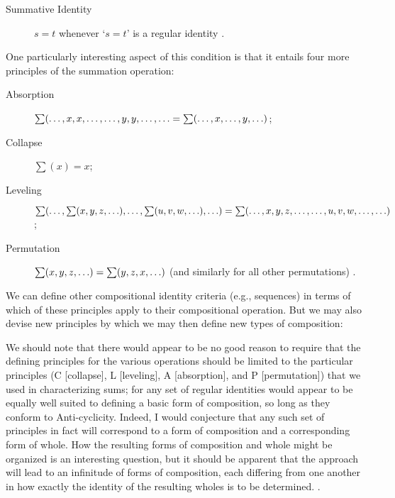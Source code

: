 \documentclass[11pt]{article}
\newenvironment{squote}{%
\begin{spacing}{1}
\begin{list}{}{%
\setlength{\labelwidth}{0pt}%
\rightmargin\leftmargin%
}
\item\relax
}{%
\end{list}%
\end{spacing}
}
\begin{document}
\begin{spacing}{1.5}
\begin{description}
  \item[Summative Identity] $s = t$ whenever `$s = t$' is a regular
    identity \citeyearpar[572]{fine2010}.
\end{description}

One particularly interesting aspect of this condition is that it
entails four more principles of the summation operation:

\begin{description}
  \item[Absorption] $\sum (\mathellipsis, x, x, \mathellipsis,
    \mathellipsis, y, y, \mathellipsis, \mathellipsis = \sum (
    \mathellipsis, x, \mathellipsis, y, \mathellipsis )$;
\item[Collapse] $\sum (x) = x$;
\item[Leveling] $\sum (\mathellipsis, \sum (x, y, z, \mathellipsis ),
  \mathellipsis, \sum (u, v, w, \mathellipsis ), \mathellipsis ) \\ =
  \sum (\mathellipsis, x, y, z, \mathellipsis, \mathellipsis, u, v, w,
  \mathellipsis, \mathellipsis )$;
\item[Permutation] $\sum (x, y, z, \mathellipsis ) = \sum (y, z, x,
  \mathellipsis )$ (and similarly for all other permutations)
  \citep[573]{fine2010}.
\end{description}

We can define other compositional identity criteria (e.g., sequences)
in terms of which of these principles apply to their compositional
operation.  But we may also devise new principles by which we may then
define new types of composition:

\begin{squote}
We should note that there would appear to be no good reason to require
that the defining principles for the various operations should be
limited to the particular principles (C [collapse], L [leveling], A
[absorption], and P [permutation]) that we used in characterizing
sums; for any set of regular identities would appear to be equally
well suited to defining a basic form of composition, so long as they
conform to Anti-cyclicity.  Indeed, I would conjecture that any such
set of principles in fact will correspond to a form of composition and
a corresponding form of whole.  How the resulting forms of composition
and whole might be organized is an interesting question, but it should
be apparent that the approach will lead to an infinitude of forms of
composition, each differing from one another in how exactly the
identity of the resulting wholes is to be
determined. \citep[575--576]{fine2010}.
\end{squote}


\end{spacing}
\end{document}
